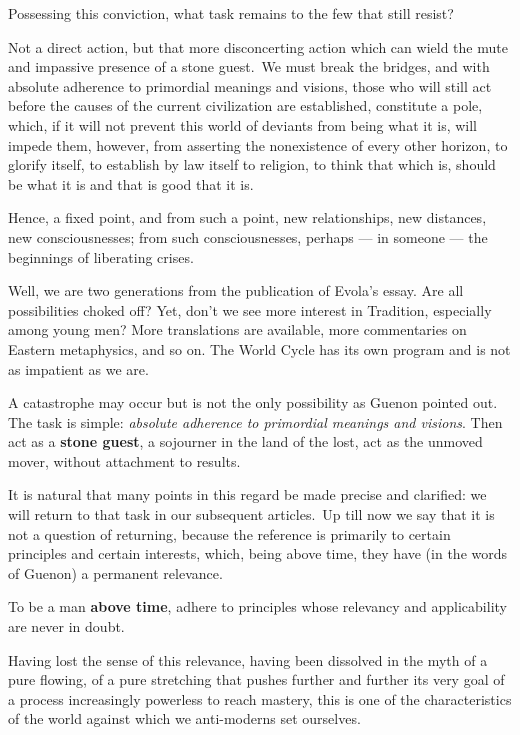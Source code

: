 Possessing this conviction, what task remains to the few that still resist? 

Not a direct action, but that more disconcerting action which can wield the mute and impassive presence of a stone guest. We must break the bridges, and with absolute adherence to primordial meanings and visions, those who will still act before the causes of the current civilization are established, constitute a pole, which, if it will not prevent this world of deviants from being what it is, will impede them, however, from asserting the nonexistence of every other horizon, to glorify itself, to establish by law itself to religion, to think that which is, should be what it is and that is good that it is. 

Hence, a fixed point, and from such a point, new relationships, new distances, new consciousnesses; from such consciousnesses, perhaps — in someone — the beginnings of liberating crises. 

\begin{quotex}
Well, we are two generations from the publication of Evola's essay. Are all possibilities choked off? Yet, don't we see more interest in Tradition, especially among young men? More translations are available, more commentaries on Eastern metaphysics, and so on. The World Cycle has its own program and is not as impatient as we are.

A catastrophe may occur but is not the only possibility as Guenon pointed out. The task is simple: \emph{absolute adherence to primordial meanings and visions}. Then act as a \textbf{stone guest}, a sojourner in the land of the lost, act as the unmoved mover, without attachment to results.

\end{quotex}
It is natural that many points in this regard be made precise and clarified: we will return to that task in our subsequent articles. Up till now we say that it is not a question of returning, because the reference is primarily to certain principles and certain interests, which, being above time, they have (in the words of Guenon) a permanent relevance.

\begin{quotex}
To be a man \textbf{above time}, adhere to principles whose relevancy and applicability are never in doubt. 

\end{quotex}
Having lost the sense of this relevance, having been dissolved in the myth of a pure flowing, of a pure stretching that pushes further and further its very goal of a process increasingly powerless to reach mastery, this is one of the characteristics of the world against which we anti-moderns set ourselves. 

